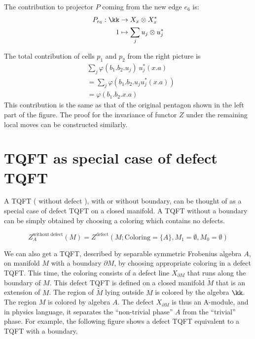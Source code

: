 \begin{defectfiguresetup}
The contribution to projector $P$ coming from the new edge $e_6$ is:
\begin{align*}
	P_{e_6}: \kk &\rightarrow X_x \otimes X_x^*\\
	1 &\mapsto  \sum_j u_j \otimes u_j^*\\
\end{align*}

The total contribution of cells $p_1$ and $p_2$ from the right picture is 
\begin{align*}
	& \sum_{j} \varphi(b_1.b_2.u_j)\ u_j^{*}(x.a)\\
	& =\sum_{j} \varphi(b_1.b_2.u_j u_j^{*}(x.a) )\\
	& =\varphi(b_1.b_2.x.a)
\end{align*}
This contribution is the same as that of the original pentagon shown in the left part of the figure. The proof for the invariance of functor $Z$ under the remaining local moves can be constructed similarly.


\section{TQFT as special case of defect TQFT}\label{s:tqft-as-dtqft}
A TQFT ( without defect ), with or without boundary, can be thought of as a special case of defect TQFT on a closed manifold. A TQFT without a boundary can be simply obtained by choosing a coloring which contains no defects.

\begin{equation}
	Z^{\mathrm{without\ defect}}_{A} (M) = Z^{\mathrm{defect}} (M; \mathrm{Coloring}={\{A\} ,M_1= \emptyset,M_0=\emptyset})
\end{equation}

We can also get a TQFT, described by separable symmetric Frobenius algebra $A$, on manifold $M$ with a boundary $\partial M$, by choosing appropriate coloring in a defect TQFT. This time, the coloring consists of a defect line $X_{\partial M}$ that runs along the boundary of $M$. This defect TQFT is defined on a closed manifold $\widetilde{M}$ that is an extension of $M$. The region of $\widetilde{M}$ lying outside $M$ is colored by the algebra $\kk$. The region $M$ is colored by algebra $A$. The defect $X_{\partial M}$ is thus an A-module, and in physics language, it separates the ``non-trivial phase'' $A$ from the ``trivial'' phase. For example, the following figure shows a defect TQFT equivalent to a TQFT with a boundary.



\end{defectfiguresetup}
